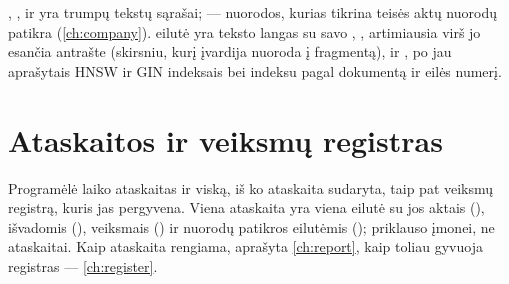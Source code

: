 , ,  ir  yra trumpų tekstų
sąrašai;  --- nuorodos, kurias tikrina teisės aktų nuorodų patikra
(\cref{ch:company}).  eilutė yra teksto langas su savo
, , artimiausia virš jo esančia antrašte 
(skirsniu, kurį įvardija nuoroda į fragmentą),  ir , po jau
aprašytais HNSW ir GIN indeksais bei indeksu pagal dokumentą ir eilės numerį.

\section{Ataskaitos ir veiksmų registras}\label{sec:data:analysis}

Programėlė  laiko ataskaitas ir viską, iš ko ataskaita sudaryta, taip pat
veiksmų registrą, kuris jas pergyvena. Viena ataskaita yra viena  eilutė su jos
aktais (), išvadomis (), veiksmais
() ir nuorodų patikros eilutėmis ();
 priklauso įmonei, ne ataskaitai. Kaip ataskaita rengiama, aprašyta
\cref{ch:report}, kaip toliau gyvuoja registras --- \cref{ch:register}.

